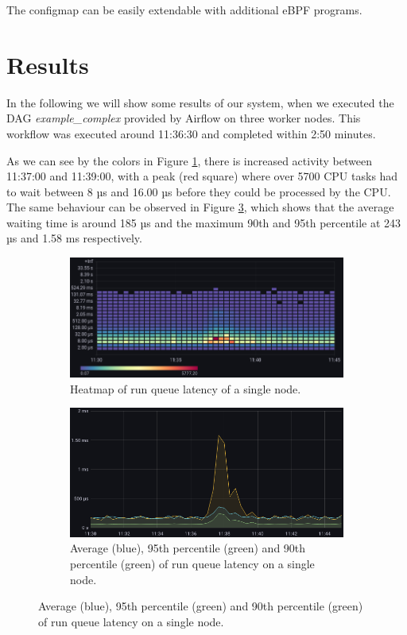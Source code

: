 \documentclass[a4paper,journal]{IEEEtran}
\begin{document}
	The configmap can be easily extendable with additional eBPF programs.
	
	
	\section{Results}
	\label{sec:results}
	In the following we will show some results of our system, when we executed the DAG \textit{example\_complex } provided by Airflow \cite{exampleComplex} on three worker nodes. This workflow was executed around 11:36:30 and completed within 2:50 minutes.
	
	As we can see by the colors in Figure \ref{fig:results:runqlat:a}, there is increased activity between 11:37:00 and 11:39:00, with a peak (red square) where over 5700 CPU tasks had to wait between 8 µs and 16.00 µs before they could be processed by the CPU.
	The same behaviour can be observed in Figure \ref{fig:results:runqlat:b}, which shows that the average waiting time is around 185 µs and the maximum 90th and 95th percentile at 243 µs and 1.58 ms respectively.
	\begin{figure}[h]
		\begin{subfigure}
			\centering
			\includegraphics[width=\linewidth]{images/results_runqlat_latency.png}
			\caption{Heatmap of run queue latency of a single node.}
			\label{fig:results:runqlat:a}
		\end{subfigure}
		\hfill
		\begin{subfigure}
			\centering
			\includegraphics[width=\linewidth]{images/results_runqlat_percentile.png}
			\caption{Average (blue), 95th percentile (green) and 90th percentile (green) of run queue latency on a single node.}
			\label{fig:results:runqlat:b}
		\end{subfigure}
	\end{figure}
	
\end{document}
